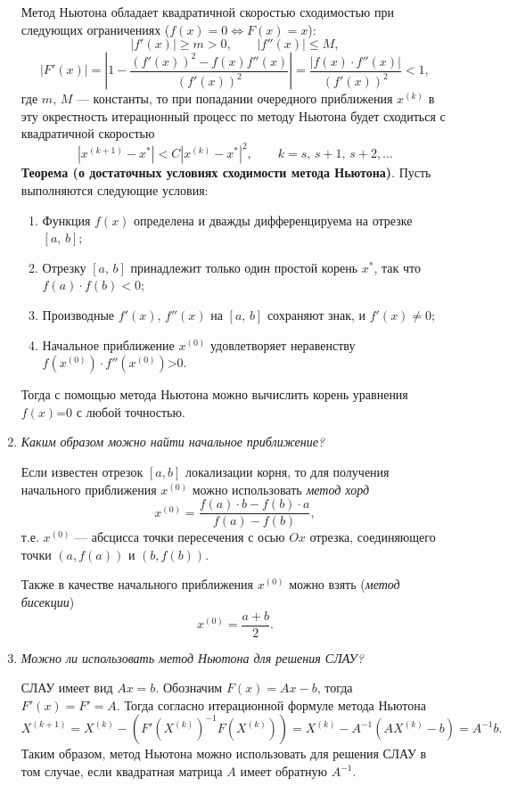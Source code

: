 \documentclass[12pt, a4paper]{article}
\begin{document}
\begin{enumerate}
		Метод Ньютона обладает квадратичной скоростью сходимостью при следующих ограничениях ($f(x) = 0 \Leftrightarrow F(x) = x$):
		\[
		|f'(x)|\ge m > 0,\qquad |f''(x)|\le M,
		\]
		\[
		 |F'(x)| = \left|1- \frac{(f'(x))^2-f(x)f''(x)}{(f'(x))^2}\right|=\frac{|f(x)\cdot f''(x)|}{(f'(x))^2}<1,
		\]
		где $m$, $M$ --- константы, то при попадании очередного приближения $x^{(k)}$ в эту окрестность итерационный процесс по методу Ньютона будет сходиться с квадратичной скоростью
		\[
		|x^{(k+1)}-x^*|<C|x^{(k)}-x^*|^2, \qquad  k = s,\,s+1,\,s+2,\dots
		\]
		\textbf{Теорема (о достаточных условиях сходимости метода Ньютона)}.
		Пусть выполняются следующие условия:
		\begin{enumerate}
			\item Функция $f(x)$ определена и дважды дифференцируема на отрезке $[a,\,b]$;
			\item Отрезку $[a,\,b]$ принадлежит только один простой корень $x^*$, так что \\$f(a)\cdot f(b)<0$;
			\item Производные $f'(x),\,f''(x)$ на $[a,\,b]$ сохраняют знак, и $f'(x)\ne0$;
			\item Начальное приближение $x^{(0)}$ удовлетворяет неравенству $f(x^{(0)})\cdot f''(x^{(0)})\mbox{>0.}$
		\end{enumerate}
	Тогда с помощью метода Ньютона можно вычислить корень уравнения $f(x)\mbox{=0}$ с любой точностью.
	\smallskip
		\item \textit{Каким образом можно найти начальное приближение?}
		\smallskip
		
		Если известен отрезок $[a,b]$ локализации корня, то для получения начального приближения $x^{(0)}$ можно использовать \textit{метод хорд}
		\[
		x^{(0)} = \frac{f(a)\cdot b -f(b) \cdot a}{f(a) - f(b)},
		\]
		т.е. $x^{(0)}$ --- абсцисса точки пересечения с осью $Ox$ отрезка, соединяющего точки $(a,f(a))$ и $(b,f(b))$.
		
		Также в качестве начального приближения $x^{(0)}$ можно взять (\textit{метод бисекции})
		\[
		x^{(0)}=\frac{a+b}{2}.
				\]
		
		\item \textit{Можно ли использовать метод Ньютона для решения СЛАУ?}
		\smallskip
		
		СЛАУ имеет вид $Ax=b$. Обозначим $F(x) = Ax-b$, тогда $F'(x) = F' = A$.
		Тогда согласно итерационной формуле метода Ньютона
		\[
		X^{(k+1)} = X^{(k)}-(F'(X^{(k)})^{-1}F(X^{(k)}))=X^{(k)}-A^{-1}(AX^{(k)}-b)=A^{-1}b.
		\]
		Таким образом, метод Ньютона можно использовать для решения СЛАУ в том случае, если квадратная матрица $A$ имеет обратную $A^{-1}$.
		

\end{enumerate}
\end{document}
